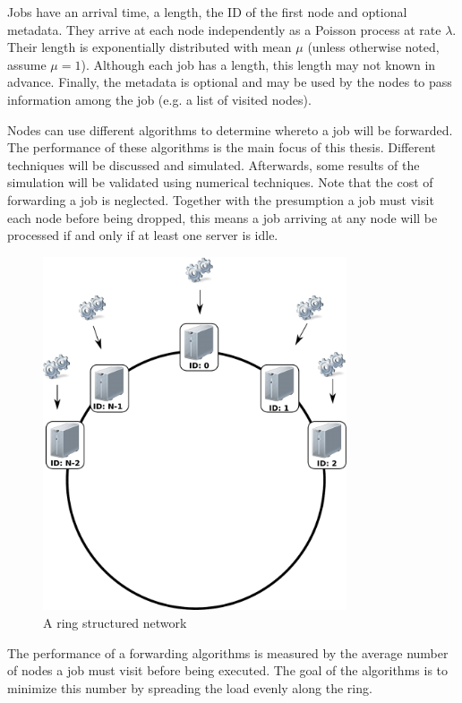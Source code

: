 \documentclass[10pt,a4paper]{article}
\begin{document}
Jobs have an arrival time, a length, the ID of the first node and optional metadata. They arrive at each node independently as a Poisson process at rate $\lambda$. Their length is exponentially distributed with mean $\mu$ (unless otherwise noted, assume $\mu=1$). Although each job has a length, this length may not known in advance. Finally, the metadata is optional and may be used by the nodes to pass information among the job (e.g. a list of visited nodes).

Nodes can use different algorithms to determine whereto a job will be forwarded. The performance of these algorithms is the main focus of this thesis. Different techniques will be discussed and simulated. Afterwards, some results of the simulation will be validated using numerical techniques.
Note that the cost of forwarding a job is neglected. Together with the presumption a job must visit each node before being dropped, this means a job arriving at any node will be processed if and only if at least one server is idle.

\begin{figure}[h!tb]
\centering
\includegraphics[width=0.8\textwidth,clip=true,trim=0px 225px 0px 0px]{resources/drawing.pdf}
\caption{A ring structured network}
\label{figring}
\end{figure}

The performance of a forwarding algorithms is measured by the average number of nodes a job must visit before being executed. The goal of the algorithms is to minimize this number by spreading the load evenly along the ring. 
\end{document}
